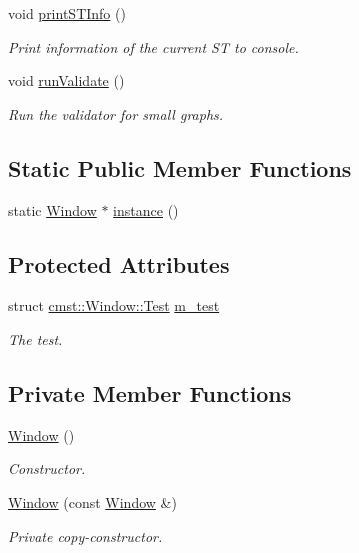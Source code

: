 \begin{DoxyCompactItemize}
void \hyperlink{classcmst_1_1_window_a5b39068b3053a7fe98f3d94de802fecb}{printSTInfo} ()
\begin{DoxyCompactList}\small\item\em Print information of the current ST to console. \end{DoxyCompactList}\item 
void \hyperlink{classcmst_1_1_window_ab2073132753d04d6cf7b882549f1ceea}{runValidate} ()
\begin{DoxyCompactList}\small\item\em Run the validator for small graphs. \end{DoxyCompactList}\end{DoxyCompactItemize}
\subsection*{Static Public Member Functions}
\begin{DoxyCompactItemize}
\item 
static \hyperlink{classcmst_1_1_window}{Window} $\ast$ \hyperlink{classcmst_1_1_window_a281790e82296e7be50c19520f136e345}{instance} ()
\end{DoxyCompactItemize}
\subsection*{Protected Attributes}
\begin{DoxyCompactItemize}
\item 
struct \hyperlink{structcmst_1_1_window_1_1_test}{cmst::Window::Test} \hyperlink{classcmst_1_1_window_aedae466fb2efd886cea6d775b20fabe3}{m\_test}
\begin{DoxyCompactList}\small\item\em The test. \end{DoxyCompactList}\end{DoxyCompactItemize}
\subsection*{Private Member Functions}
\begin{DoxyCompactItemize}
\item 
\hyperlink{classcmst_1_1_window_a2f0377f780b0dec7f9ca43145d98e8d1}{Window} ()
\begin{DoxyCompactList}\small\item\em Constructor. \end{DoxyCompactList}\item 
\hyperlink{classcmst_1_1_window_a3a06a150faa316137c794be5acac4979}{Window} (const \hyperlink{classcmst_1_1_window}{Window} \&)
\begin{DoxyCompactList}\small\item\em Private copy-\/constructor. \end{DoxyCompactList}\end{DoxyCompactItemize}
